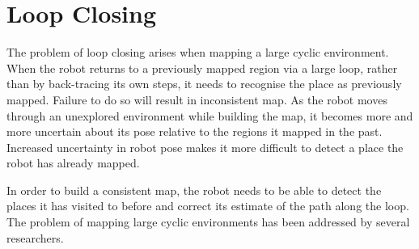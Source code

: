 

\section{Loop Closing}
\label{sec:back_loop}

The problem of loop closing arises when mapping a large cyclic
environment. When the robot returns to a previously mapped region via
a large loop, rather than by back-tracing its own steps, it needs to
recognise the place as previously mapped. Failure to do so will result
in inconsistent map.  As the robot moves through an unexplored
environment while building the map, it becomes more and more uncertain
about its pose relative to the regions it mapped in the past.
Increased uncertainty in robot pose makes it more difficult to
detect a place the robot has already mapped.


In order to build a consistent map, the robot needs to be able to
detect the places it has visited to before and correct its estimate of
the path along the loop. The problem of mapping large cyclic
environments has been addressed by several researchers.




